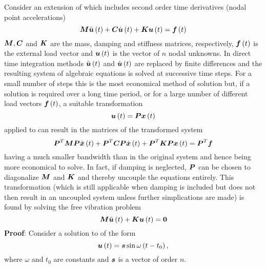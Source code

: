 Consider an extension of  which includes second order
time derivatives (\eg nodal point accelerations)
\begin{equation}
  \matr{M}\fnof{\ddot{\vect{u}}}{t} + \matr{C}\fnof{\dot{\vect{u}}}{t}
         + \matr{K}\fnof{\vect{u}}{t} = \fnof{\vect{f}}{t}
  \label{eqn:npa}
\end{equation}
$\matr{M},\matr{C}$ and $\matr{K}$ are the mass, damping and stiffness
matrices, respectively, $\fnof{\vect{f}}{t}$ is the external load vector
and $\fnof{\vect{u}}{t}$ is the vector of $n$ nodal unknowns. In direct
time integration methods $\fnof{\ddot{\vect{u}}}{t}$ and
$\fnof{\dot{\vect{u}}}{t}$ are replaced by finite differences and the
resulting system of algebraic equations is solved at successive time steps.
For a small number of steps this is the most economical method of solution
but, if a solution is required over a long time period, or for a large
number of different load  vectors $\fnof{\vect{f}}{t}$, a suitable transformation
\begin{equation}
  \fnof{\vect{u}}{t}=\matr{P}\fnof{\vect{x}}{t}
  \label{eqn:suittrans}
\end{equation}
applied to  can result in the matrices of the transformed system
\begin{equation}
  \transpose{\matr{P}}\matr{M}\matr{P}\fnof{\ddot{\vect{x}}}{t} +
  \transpose{\matr{P}}\matr{C}\matr{P}\fnof{\dot{\vect{x}}}{t} +
  \transpose{\matr{P}}\matr{K}\matr{P}\fnof{\vect{x}}{t}
        = \transpose{\matr{P}}\vect{f}
  \label{eqn:tsyst}
\end{equation}
having a much smaller bandwidth than in the original system and hence being
more economical to solve. In fact, if damping is neglected, $\matr{P}$ can be
chosen to diagonalize $\matr{M}$ and $\matr{K}$ and thereby uncouple the equations
entirely.  This transformation (which is still applicable when damping is
included but does not then result in an uncoupled system unless further
simplications are made) is found by solving the free vibration problem
\begin{equation}
  \matr{M}\fnof{\ddot{\vect{u}}}{t} + \matr{K}\fnof{\vect{u}}{t} 
        = \vect{0}
  \label{eqn:vibprob}
\end{equation}
\textbf{Proof}: Consider a solution to  of the form
\begin{equation}
  \fnof{\vect{u}}{t}=\vect{s} \sin \omega \pbrac{t-t_{0}},
  \label{eqn:sineq}
\end{equation}
where $\omega$ and $t_{0}$ are constants and $\vect{s}$ is a vector of order $n$. 
